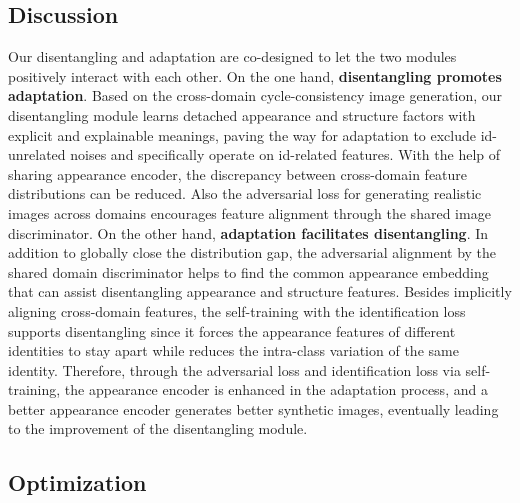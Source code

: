 \documentclass[runningheads]{llncs}
\begin{document}
\subsection{Discussion}
Our disentangling and adaptation are co-designed to let the two modules positively interact with each other. On the one hand, \textbf{disentangling promotes adaptation}. Based on the cross-domain cycle-consistency image generation, our disentangling module learns detached appearance and structure factors with explicit and explainable meanings, paving the way for adaptation to exclude id-unrelated noises and specifically operate on id-related features. With the help of sharing appearance encoder, the discrepancy between cross-domain feature distributions can be reduced. Also the adversarial loss for generating realistic images across domains encourages feature alignment through the shared image discriminator. On the other hand, \textbf{adaptation facilitates disentangling}. In addition to globally close the distribution gap, the adversarial alignment by the shared domain discriminator helps to find the common appearance embedding that can assist disentangling appearance and structure features. Besides implicitly aligning cross-domain features, the self-training with the identification loss supports disentangling since it forces the appearance features of different identities to stay apart while reduces the intra-class variation of the same identity. 
Therefore, through the adversarial loss and identification loss via self-training, the appearance encoder is enhanced in the adaptation process, and a better appearance encoder generates better synthetic images, eventually leading to the improvement of the disentangling module. 





\subsection{Optimization}
\end{document}
